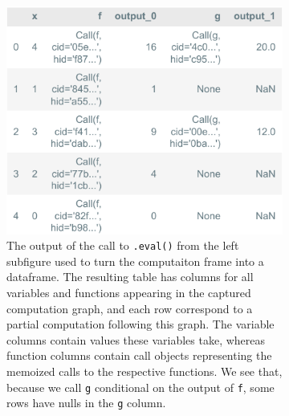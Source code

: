 \begin{figure}[htbp]
\begin{minipage}[b]{0.48\textwidth}
        \begin{subfigure}[b]{\textwidth}
            \centering
            \includegraphics[width=\textwidth]{img/fig5.pdf}
            \caption{The output of the call to \texttt{.eval()} from the left
            subfigure used to turn the computaiton frame into a dataframe. The
            resulting table has columns for all variables and functions
            appearing in the captured computation graph, and each row correspond
            to a partial computation following this graph. The variable columns
            contain values these variables take, whereas function columns
            contain call objects representing the memoized calls to the
            respective functions. We see that, because we call \texttt{g}
            conditional on the output of \texttt{f}, some rows have nulls in the
            \texttt{g} column.}
            \label{fig:figure2}
        \end{subfigure}
    \end{minipage}
    \hfill
    \begin{minipage}[b]{0.45\textwidth}
        \begin{subfigure}[b]{\textwidth}
            \centering

\end{subfigure}
\end{minipage}
\end{figure}
